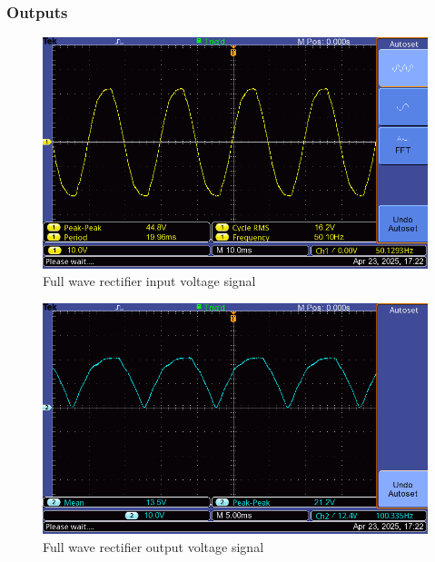 \documentclass[12pt]{article}
\begin{document}
\subsubsection*{Outputs}
\begin{figure}[H]
    \centering
    \includegraphics[width=.8\textwidth]{fullb_r_load6_in.png}
    \caption{Full wave rectifier input voltage signal}
    \label{fig:rLoad}
\end{figure}

\begin{figure}[H]
    \centering
    \includegraphics[width=.8\textwidth]{fullb_r_load6_out.png}
    \caption{Full wave rectifier output voltage signal}
    \label{fig:rLoadDelay}
\end{figure}


\renewcommand{\bibname}{References}

\end{document}
